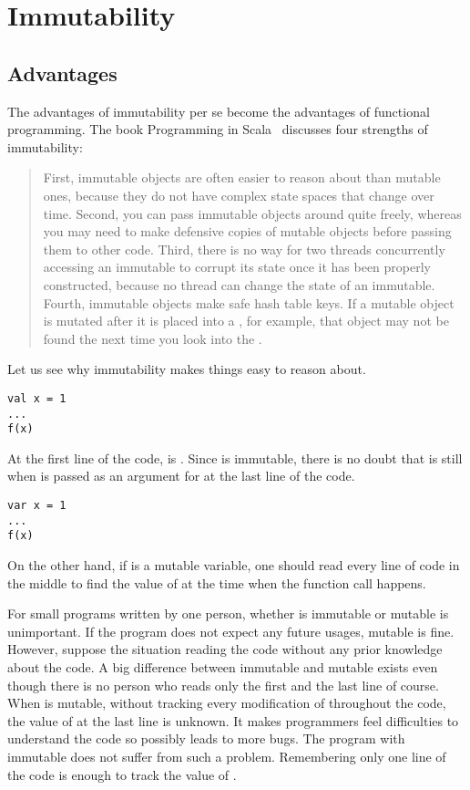 \setchapterpreamble[u]{\margintoc}
\chapter{Immutability}

\section{Advantages}

The advantages of immutability per se become the advantages of functional
programming. The book Programming in Scala~\cite{programming-in-scala}
discusses four strengths of immutability:

\begin{quote}
First, immutable objects are often easier to reason about than mutable ones,
because they do not have complex state spaces that change over time. Second, you
can pass immutable objects around quite freely, whereas you may need to make
defensive copies of mutable objects before passing them to other code. Third,
there is no way for two threads concurrently accessing an immutable to corrupt
its state once it has been properly constructed, because no thread can change the
state of an immutable. Fourth, immutable objects make safe hash table keys. If a
mutable object is mutated after it is placed into a , for example,
that object may not be found the next time you look into the .
\end{quote}

Let us see why immutability makes things easy to reason about.

\begin{verbatim}
val x = 1
...
f(x)
\end{verbatim}

At the first line of the code,  is . Since  is immutable,
there is no doubt that  is still  when  is passed as an
argument for  at the last line of the code.

\begin{verbatim}
var x = 1
...
f(x)
\end{verbatim}

On the other hand, if  is a mutable variable, one should read every line
of code in the middle to find the value of  at the time when the function
call happens.

For small programs written by one person, whether  is immutable or
mutable is unimportant. If the program does not expect any future usages, mutable
 is fine. However, suppose the situation reading the code without any
prior knowledge about the code. A big difference between immutable and mutable
 exists even though there is no person who reads only the first and the
last line of course. When  is mutable, without tracking every
modification of  throughout the code, the value of  at the last
line is unknown. It makes programmers feel difficulties to understand the code so
possibly leads to more bugs. The program with immutable  does not suffer
from such a problem. Remembering only one line of the code is enough to track the
value of .


